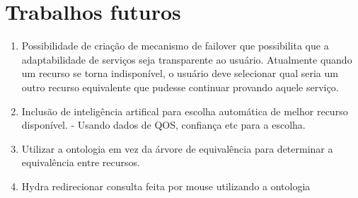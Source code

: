 \section{Trabalhos futuros}


\begin{enumerate}
	\item Possibilidade de criação de mecanismo de failover que possibilita que a adaptabilidade de serviços seja transparente ao usuário. Atualmente quando um recurso se torna indisponível, o usuário deve selecionar qual seria um outro recurso equivalente que pudesse continuar provando aquele serviço. 
	\item Inclusão de inteligência artifical para escolha automática de melhor recurso disponível.
		- Usando dados de QOS, confiança etc para a escolha.
	\item Utilizar a ontologia em vez da árvore de equivalência para determinar a equivalência entre recursos.
	\item Hydra redirecionar consulta feita por mouse utilizando a ontologia
\end{enumerate}
